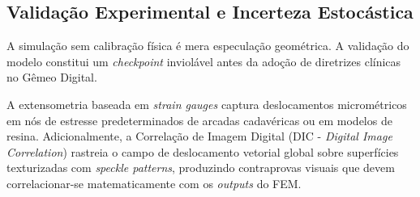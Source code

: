 \subsection{Validação Experimental e Incerteza Estocástica}
\label{subsec:validacao}

A simulação sem calibração física é mera especulação geométrica. A validação do modelo constitui um \textit{checkpoint} inviolável antes da adoção de diretrizes clínicas no Gêmeo Digital.

A extensometria baseada em \textit{strain gauges} captura deslocamentos micrométricos em nós de estresse predeterminados de arcadas cadavéricas ou em modelos de resina. Adicionalmente, a Correlação de Imagem Digital (DIC - \textit{Digital Image Correlation}) rastreia o campo de deslocamento vetorial global sobre superfícies texturizadas com \textit{speckle patterns}, produzindo contraprovas visuais que devem correlacionar-se matematicamente com os \textit{outputs} do FEM.

